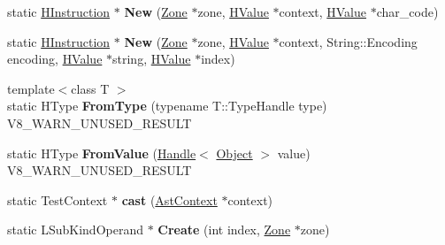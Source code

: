 \begin{DoxyCompactItemize}
\item 
\hypertarget{classv8_1_1internal_1_1_v8___f_i_n_a_l_a1e898f45b48d3b440c5b5503852bdbc2}{}static \hyperlink{classv8_1_1internal_1_1_h_instruction}{H\+Instruction} $\ast$ {\bfseries New} (\hyperlink{classv8_1_1internal_1_1_zone}{Zone} $\ast$zone, \hyperlink{classv8_1_1internal_1_1_h_value}{H\+Value} $\ast$context, \hyperlink{classv8_1_1internal_1_1_h_value}{H\+Value} $\ast$char\+\_\+code)\label{classv8_1_1internal_1_1_v8___f_i_n_a_l_a1e898f45b48d3b440c5b5503852bdbc2}

\item 
\hypertarget{classv8_1_1internal_1_1_v8___f_i_n_a_l_a9ce8db4d39ebbae8d958a851d33a4b68}{}static \hyperlink{classv8_1_1internal_1_1_h_instruction}{H\+Instruction} $\ast$ {\bfseries New} (\hyperlink{classv8_1_1internal_1_1_zone}{Zone} $\ast$zone, \hyperlink{classv8_1_1internal_1_1_h_value}{H\+Value} $\ast$context, String\+::\+Encoding encoding, \hyperlink{classv8_1_1internal_1_1_h_value}{H\+Value} $\ast$string, \hyperlink{classv8_1_1internal_1_1_h_value}{H\+Value} $\ast$index)\label{classv8_1_1internal_1_1_v8___f_i_n_a_l_a9ce8db4d39ebbae8d958a851d33a4b68}

\item 
\hypertarget{classv8_1_1internal_1_1_v8___f_i_n_a_l_a7beade083506413953f7290cea0c29a7}{}{\footnotesize template$<$class T $>$ }\\static H\+Type {\bfseries From\+Type} (typename T\+::\+Type\+Handle type) V8\+\_\+\+W\+A\+R\+N\+\_\+\+U\+N\+U\+S\+E\+D\+\_\+\+R\+E\+S\+U\+L\+T\label{classv8_1_1internal_1_1_v8___f_i_n_a_l_a7beade083506413953f7290cea0c29a7}

\item 
\hypertarget{classv8_1_1internal_1_1_v8___f_i_n_a_l_a9ffc17bc14465e9ce4e3ab1c196c9bb2}{}static H\+Type {\bfseries From\+Value} (\hyperlink{classv8_1_1internal_1_1_handle}{Handle}$<$ \hyperlink{classv8_1_1internal_1_1_object}{Object} $>$ value) V8\+\_\+\+W\+A\+R\+N\+\_\+\+U\+N\+U\+S\+E\+D\+\_\+\+R\+E\+S\+U\+L\+T\label{classv8_1_1internal_1_1_v8___f_i_n_a_l_a9ffc17bc14465e9ce4e3ab1c196c9bb2}

\item 
\hypertarget{classv8_1_1internal_1_1_v8___f_i_n_a_l_a14a838ad310cafef7ad8f2814522f496}{}static Test\+Context $\ast$ {\bfseries cast} (\hyperlink{classv8_1_1internal_1_1_ast_context}{Ast\+Context} $\ast$context)\label{classv8_1_1internal_1_1_v8___f_i_n_a_l_a14a838ad310cafef7ad8f2814522f496}

\item 
\hypertarget{classv8_1_1internal_1_1_v8___f_i_n_a_l_a03f3e9f574b97347ad6fc035015d2106}{}static L\+Sub\+Kind\+Operand $\ast$ {\bfseries Create} (int index, \hyperlink{classv8_1_1internal_1_1_zone}{Zone} $\ast$zone)\label{classv8_1_1internal_1_1_v8___f_i_n_a_l_a03f3e9f574b97347ad6fc035015d2106}


\end{DoxyCompactItemize}
